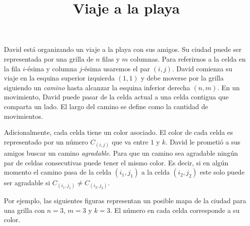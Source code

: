 \documentclass{oci}
\title{Viaje a la playa}
\begin{document}
\begin{problemDescription}
David está organizando un viaje a la playa con sus amigos.
%
Su ciudad puede ser representada por una grilla de $n$ filas y $m$ columnas.
%
Para referirnos a la celda en la fila $i$-ésima y columna $j$-ésima usaremos
el par $(i,j)$.
%
David comienza su viaje en la esquina superior izquierda $(1, 1)$ y debe
moverse por la grilla siguiendo un \emph{camino} hasta alcanzar la esquina
inferior derecha $(n, m)$.
%
En un movimiento, David puede pasar de la celda actual a una celda contigua
que comparta un lado.
%
El largo del camino se define como la cantidad de movimientos.

Adicionalmente, cada celda tiene un color asociado.
%
El color de cada celda es representado por un número $C_{(i,j)}$ que va entre $1$ y $k$.
%
David le prometió a sus amigos buscar un camino \emph{agradable}.
%
Para que un camino sea agradable ningún par de celdas consecutivas
puede tener el mismo color.
%
Es decir, si en algún momento el camino pasa de la celda $(i_1,j_1)$ a la
celda $(i_2,j_2)$ este solo puede ser agradable si $C_{(i_1,j_1)} \neq C_{(i_2,j_2)}$.

Por ejemplo, las siguientes figuras representan un posible mapa de la ciudad para
una grilla con $n=3$, $m=3$ y $k=3$.
%
El número en cada celda corresponde a su color.
\begin{figure}[!h]
\centering
{}
\end{figure}
\end{problemDescription}
\end{document}
